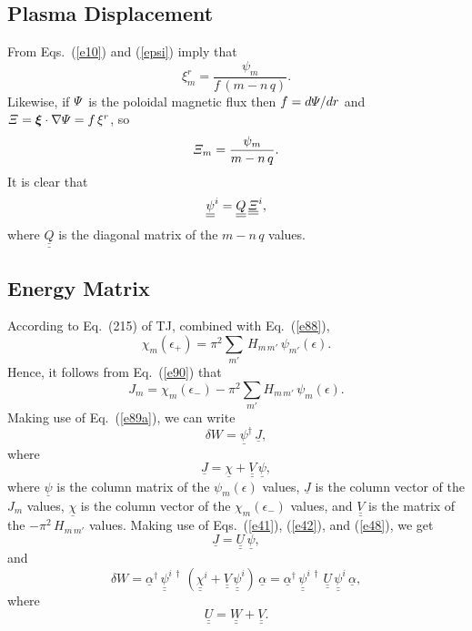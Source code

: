\documentclass[12pt,prb,aps,notitlepage]{revtex4-1}
\newcommand{\bxi}{\mbox{\boldmath$\xi$}}
\begin{document}
\subsection{Plasma Displacement}
From Eqs.~(\ref{e10}) and (\ref{epsi}) imply that
\begin{equation}
\xi^r_m = \frac{\psi_m}{f\,(m-n\,q)}.
\end{equation}
Likewise, if ${\mit\Psi}$ is the poloidal magnetic flux then $f=d{\mit\Psi}/dr$ and ${\mit\Xi}=\bxi\cdot\nabla{\mit\Psi}= f\,\xi^r$, so
\begin{equation}
{\mit\Xi}_m = \frac{\psi_m}{m-n\,q}.
\end{equation}
It is clear that
\begin{equation}
\underline{\underline{\psi}}^i = \underline{\underline{Q}}\,\underline{\underline{\mit\Xi}}^i,
\end{equation}
where $\underline{\underline{Q}}$ is the diagonal matrix of the $m-n\,q$ values. 

\subsection{Energy Matrix}
According to Eq.~(215) of TJ, combined with Eq.~(\ref{e88}), 
\begin{equation}
\chi_m(\epsilon_+)=\pi^2\sum_{m'}\,H_{m\,m'}\,\psi_{m'}(\epsilon).
\end{equation}
Hence, it follows from Eq.~(\ref{e90}) that
\begin{equation}
J_m = \chi_m(\epsilon_-)-\pi^2\sum_{m'} H_{m\,m'}\,\psi_m(\epsilon).
\end{equation}
Making use of Eq.~(\ref{e89a}), we can write
\begin{equation}
\delta W = \underline{\psi}^\dag\,\underline{J},
\end{equation}
where 
\begin{equation}
\underline{J} = \underline{\chi}+ \underline{\underline{V}}\,\underline{\psi},
\end{equation}
where  $\underline{\psi}$ is the column matrix of the $\psi_m(\epsilon)$ values, $\underline{J}$ is the column vector of the $J_m$ values, $\underline{\chi}$ is the column vector of the $\chi_m(\epsilon_-)$ values,
and $\underline{\underline{V}}$ is the matrix of the $-\pi^2\,H_{m\,m'}$ values. 
Making use of Eqs.~(\ref{e41}), (\ref{e42}), and (\ref{e48}), we get 
\begin{equation}
\underline{J} = \underline{\underline{U}}\,\underline{\psi},
\end{equation}
and
\begin{equation}
\delta W = \underline{\alpha}^\dag\,\underline{\underline{\psi}}^{i\,\dag}\,(\underline{\underline{\chi}}^i + \underline{\underline{V}}\,\underline{\underline{\psi}}^i)\,\underline{\alpha}=  \underline{\alpha}^\dag\,\underline{\underline{\psi}}^{i\,\dag}\,\underline{\underline{U}}\,\underline{\underline{\psi}}^i\,\underline{\alpha},
\end{equation}
where
\begin{equation}
\underline{\underline{U}}=\underline{\underline{W}}+\underline{\underline{V}}.
\end{equation}
\end{document}

